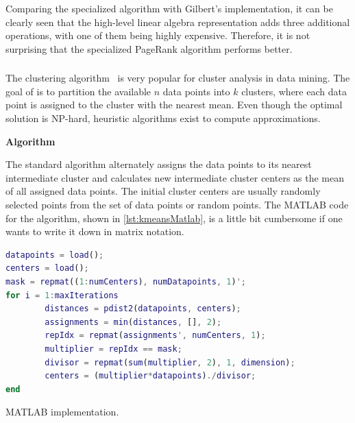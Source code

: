 Comparing the specialized algorithm with Gilbert's implementation, it can be clearly seen that the high-level linear algebra representation adds three additional operations, with one of them being highly expensive.
Therefore, it is not surprising that the specialized PageRank algorithm performs better.

\subsubsection{\kmeans}

The \kmeans clustering algorithm~\cite{macqueen:1967a} is very popular for cluster analysis in data mining.
The goal of \kmeans is to partition the available $n$ data points into $k$ clusters, where each data point is assigned to the cluster with the nearest mean.
Even though the optimal solution is NP-hard, heuristic algorithms exist to compute approximations.

\textbf{Algorithm}

The standard algorithm alternately assigns the data points to its nearest intermediate cluster and calculates new intermediate cluster centers as the mean of all assigned data points.
The initial cluster centers are usually randomly selected points from the set of data points or random points.
The MATLAB code for the \kmeans algorithm, shown in \cref{lst:kmeansMatlab}, is a little bit cumbersome if one wants to write it down in matrix notation.

\begin{listing}
	\begin{CenteredBox}
		\begin{lstlisting}[language=Matlab,
		commentstyle=\color{black},
		  stringstyle=\color{black},
		  keywordstyle=\color{black}\bfseries,
		  morekeywords={pdist2, repmat, },]
datapoints = load();
centers = load();
mask = repmat((1:numCenters), numDatapoints, 1)';
for i = 1:maxIterations
		distances = pdist2(datapoints, centers);
		assignments = min(distances, [], 2);
		repIdx = repmat(assignments', numCenters, 1);
		multiplier = repIdx == mask;
		divisor = repmat(sum(multiplier, 2), 1, dimension);
		centers = (multiplier*datapoints)./divisor;
end
		\end{lstlisting}
	\end{CenteredBox}
	\caption{MATLAB \kmeans implementation.}
	\label{lst:kmeansMatlab}
\end{listing}

